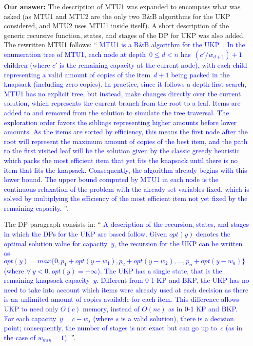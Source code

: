 \documentclass{elsarticle}
\begin{document}
\textbf{Our answer:} The description of MTU1 was expanded to encompass what was asked (as MTU1 and MTU2 are the only two B\&B algorithms for the UKP considered, and MTU2 uses MTU1 inside itself). A short description of the generic recursive function, states, and stages of the DP for UKP was also added. The rewritten MTU1 follows: ``\textcolor{blue}{
MTU1 is a B\&B algorithm for the UKP~\citep{mtu1}. %
In the enumeration tree of MTU1, each node at depth~\(0 \leq d < n\) has~\((c'/w_{d+1}) + 1\) children (where \(c'\) is the remaining capacity at the current node), with each child representing a valid amount of copies of the item~\(d+1\) being packed in the knapsack (including zero copies).
In practice, since it follows a depth-first search, MTU1 has no explicit tree, but instead, make changes directly over the current solution, which represents the current branch from the root to a leaf.
Items are added to and removed from the solution to simulate the tree traversal.
The exploration order favors the siblings representing higher amounts before lower amounts.
As the items are sorted by efficiency, this means the first node after the root will represent the maximum amount of copies of the best item, and the path to the first visited leaf will be the solution given by the classic greedy heuristic which packs the most efficient item that yet fits the knapsack until there is no item that fits the knapsack. Consequently, the algorithm already begins with this lower bound.
The upper bound computed by MTU1 in each node is the continuous relaxation of the problem with the already set variables fixed, which is solved by multiplying the efficiency of the most efficient item not yet fixed by the remaining capacity.
}''.

The DP paragraph consists in: ``\textcolor{blue}{
A description of the recursion, states, and stages in which the DPs for the UKP are based follow.
Given \(opt(y)\) denotes the optimal solution value for capacity~\(y\), the recursion for the UKP can be written as \(opt(y) = max \{0, p_1 + opt(y - w_1), p_2 + opt(y - w_2), \dots, p_n + opt(y - w_n)\}\) (where \(\forall~y < 0.~opt(y) = -\infty\)).
The UKP has a single state, that is the remaining knapsack capacity~\(y\).
Different from 0-1 KP and BKP, the UKP has no need to take into account which items were already used at each decision as there is an unlimited amount of copies available for each item.
This difference allows UKP to need only \(O(c)\) memory, instead of \(O(nc)\) as in 0-1 KP and BKP.
For each capacity~\(y = c - w_s\) (where \(s\) is a valid solution), there is a decision point; consequently, the number of stages is not exact but can go up to~\(c\) (as in the case of \(w_{min} = 1\)).
}''.
\bigskip
\end{document}
